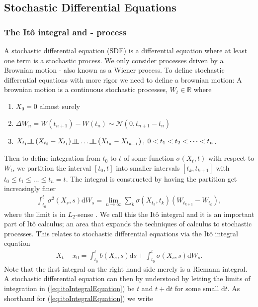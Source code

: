 \subsection{Stochastic Differential Equations}
\subsubsection{The Itô integral and - process}
A stochastic differential equation (SDE) is a differential equation where at least one term is a stochastic process. We only consider processes driven by a Brownian motion - also known as a Wiener process. To define stochastic differential equations with more rigor we need to define a brownian motion: A brownian motion is a continuous stochastic processes, $W_t\in\mathbb{R}$ where
\begin{enumerate}
    \item $X_0 = 0$ almost surely
    \item $\Delta W_n = W\left(t_{n + 1}\right) - W\left(t_{n}\right)\sim\mathcal{N}\left(0, t_{n + 1} - t_{n}\right)$
    \item $X_{t_1}\indep \left(X_{t_2} - X_{t_1}\right)\indep \dots \indep \left(X_{t_n} - X_{t_{n - 1}}\right), \: 0 < t_1 < t_2 < \dots < t_n$.
\end{enumerate}
Then to define integration from $t_0$ to $t$ of some function $\sigma(X_t, t)$ with respect to $W_t$, we partition the interval $[t_0, t]$ into smaller intervals $[t_k, t_{k + 1}]$ with $t_0 \leq t_1 \leq \dots \leq t_n = t$. The integral is constructed by having the partition get increasingly finer
\begin{align}
    \int_{t_0}^t \sigma^2(X_s, s) \mathrm{d}W_s = \lim_{n \to \infty}\sum_k \sigma\left(X_{t_k}, t_k\right)\left(W_{t_{k + 1}} - W_{t_k}\right),
\end{align}
where the limit is in $L_2$-sense \cite[equation 4.6]{Srkk2019}. We call this the Itô integral and it is an important part of Itô calculus; an area that expands the techniques of calculus to stochastic processes. This relates to stochastic differential equations via the Itô integral equation
\begin{align}
    X_t - x_0 = \int_{t_0}^t b(X_s, s)\mathrm{d}s + \int_{t_0}^t \sigma(X_s, s)\mathrm{d}W_s. \label{eq:itoIntegralEquation}
\end{align}
Note that the first integral on the right hand side merely is a Riemann integral. A stochastic differential equation can then by understood by letting the limits of integration in (\ref{eq:itoIntegralEquation}) be $t$ and $t+\mathrm{d}t$ for some small $\mathrm{d}t$. As shorthand for (\ref{eq:itoIntegralEquation}) we write
